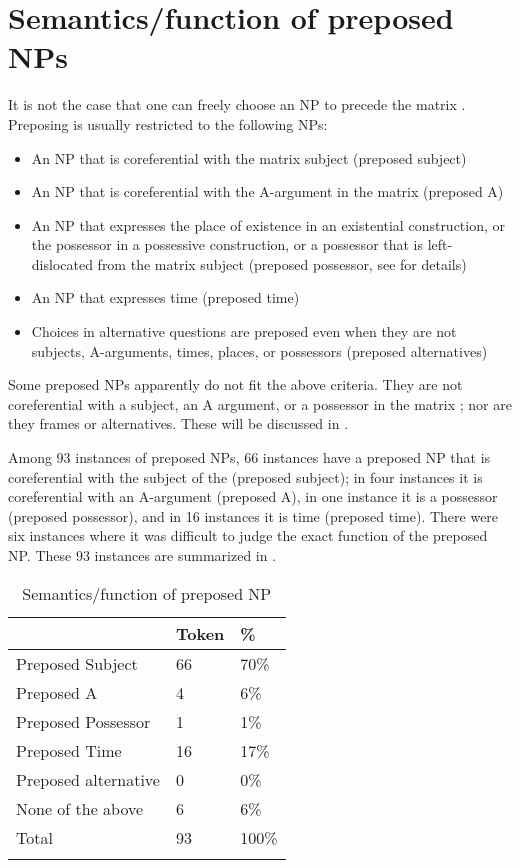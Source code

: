 \documentclass[output=paper
,modfonts
,nonflat]{langsci/langscibook}
\begin{document}
\section{\label{s:tsukida:2}Semantics/function of preposed NPs}

It is not the case that one can freely choose an NP to precede the matrix . Preposing is usually restricted to the following NPs:

\begin{itemize}
\item An NP that is coreferential with the matrix subject (preposed subject)
\item An NP that is coreferential with the A-argument in the matrix  (preposed A)
\item An NP that expresses the place of existence in an existential construction, or the possessor in a possessive construction, or a possessor that is left-dislocated from the matrix subject (preposed possessor, see  for details)
\item An NP that expresses time (preposed time)
\item Choices in alternative questions are preposed even when they are not subjects, A-arguments, times, places, or possessors (preposed alternatives)
\end{itemize}

\noindent
Some preposed NPs apparently do not fit the above criteria. They are not coreferential with a subject, an A argument, or a possessor in the matrix ; nor are they frames or alternatives. These will be discussed in . 

Among 93 instances of preposed NPs, 66 instances have a preposed NP that is coreferential with the subject of the  (preposed subject); in four instances it is coreferential with an A-argument (preposed A), in one instance it is a possessor (preposed possessor), and in 16 instances it is time (preposed time). There were six instances where it was difficult to judge the exact function of the preposed NP. These 93 instances are summarized in .

\begin{table}
	\begin{tabularx}{\textwidth}{Xll} 
		\lsptoprule
		& Token & \%\\
		\midrule
		Preposed Subject & 66 & 70\%\\
		Preposed A & 4 & 6\%\\
		Preposed Possessor & 1 & 1\%\\
		Preposed Time & 16 & 17\%\\
		Preposed alternative & 0 & 0\%\\
		None of the above & 6 & 6\%\\
		\midrule
		Total & 93 & 100\%\\
		\lspbottomrule
	\end{tabularx}
	\caption{Semantics/function of preposed NP}
	\label{tab:tsukida:2}
\end{table}
\end{document}

